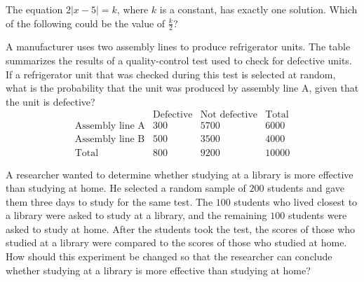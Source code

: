 \noindent\markforreview
\vspace{1em}

The equation \(2|x-5|=k\), where \(k\) is a constant, has exactly one solution.
Which of the following could be the value of \(\frac{k}{2}\)?

\vspace{2em}

\noindent\markforreview
\vspace{1em}

A manufacturer uses two assembly lines to produce refrigerator units. The table
summarizes the results of a quality-control test used to check for defective
units. If a refrigerator unit that was checked during this test is selected at
random, what is the probability that the unit was produced by assembly line A,
given that the unit is defective?
\[
\begin{array}{c|ccc}
&\text{Defective}&\text{Not defective}&\text{Total}\\ \hline
\text{Assembly line A}&300&5700&6000\\
\text{Assembly line B}&500&3500&4000\\ \hline
\text{Total}&800&9200&10000
\end{array}
\]

\newpage

\noindent\markforreview
\vspace{1em}

A researcher wanted to determine whether studying at a library is more effective
than studying at home. He selected a random sample of \(200\) students and gave
them three days to study for the same test. The \(100\) students who lived closest
to a library were asked to study at a library, and the remaining \(100\) students
were asked to study at home. After the students took the test, the scores of those
who studied at a library were compared to the scores of those who studied at
home. How should this experiment be changed so that the researcher can conclude
whether studying at a library is more effective than studying at home?

